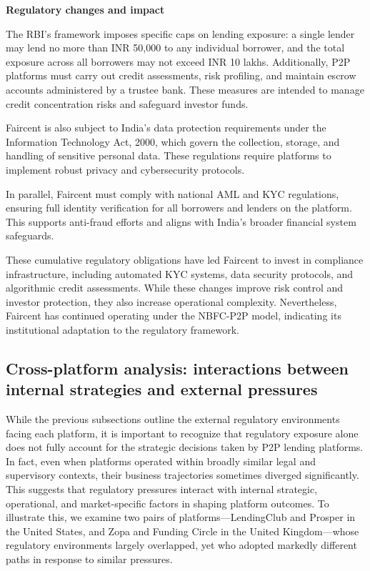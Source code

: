 \documentclass[pdflatex,sn-apa]{sn-jnl}%
\theoremstyle{thmstyleone}%
\theoremstyle{thmstyletwo}%
\theoremstyle{thmstylethree}%
\begin{document}
\textbf{Regulatory changes and impact}

The RBI’s framework imposes specific caps on lending exposure: a single lender may lend no more than INR 50,000 to any individual borrower, and the total exposure across all borrowers may not exceed INR 10 lakhs. Additionally, P2P platforms must carry out credit assessments, risk profiling, and maintain escrow accounts administered by a trustee bank. These measures are intended to manage credit concentration risks and safeguard investor funds.

Faircent is also subject to India's data protection requirements under the Information Technology Act, 2000, which govern the collection, storage, and handling of sensitive personal data. These regulations require platforms to implement robust privacy and cybersecurity protocols.

In parallel, Faircent must comply with national AML and KYC regulations, ensuring full identity verification for all borrowers and lenders on the platform. This supports anti-fraud efforts and aligns with India’s broader financial system safeguards.

These cumulative regulatory obligations have led Faircent to invest in compliance infrastructure, including automated KYC systems, data security protocols, and algorithmic credit assessments. While these changes improve risk control and investor protection, they also increase operational complexity. Nevertheless, Faircent has continued operating under the NBFC-P2P model, indicating its institutional adaptation to the regulatory framework.

\subsection{Cross-platform analysis: interactions between internal strategies and external pressures}
\textcolor{NavyBlue}{
While the previous subsections outline the external regulatory environments facing each platform, it is important to recognize that regulatory exposure alone does not fully account for the strategic decisions taken by P2P lending platforms. In fact, even when platforms operated within broadly similar legal and supervisory contexts, their business trajectories sometimes diverged significantly. This suggests that regulatory pressures interact with internal strategic, operational, and market-specific factors in shaping platform outcomes. To illustrate this, we examine two pairs of platforms—LendingClub and Prosper in the United States, and Zopa and Funding Circle in the United Kingdom—whose regulatory environments largely overlapped, yet who adopted markedly different paths in response to similar pressures.
}
\end{document}
